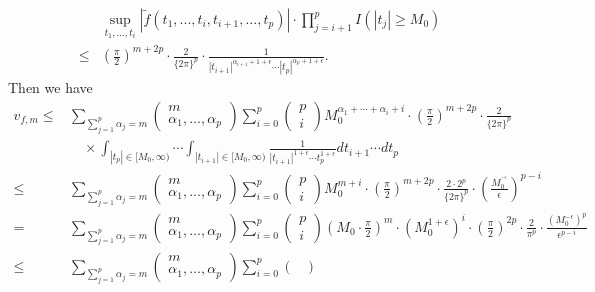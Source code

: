 \documentclass[11pt]{article}
\numberwithin{equation}{section}
\begin{document}
\begin{align*}
	&\sup_{t_1,...,t_i}|\widetilde{f}(t_1,...,t_i,t_{i+1},...,t_p)|\cdot \prod_{j=i+1}^pI(|t_j|\geq M_0)  \\
	\leq& \left(\frac{\pi}{2}\right)^{m+2p}\cdot\frac{2}{\{2\pi\}^{p}}\cdot   \frac{1}{|t_{i+1}|^{\alpha_{i+1}+1+\epsilon}\cdots |t_p|^{\alpha_{p}+1+\epsilon}}.
\end{align*}
Then we have
\begin{align*}
	v_{f,m}	
	\leq & \sum_{\sum_{j=1}^p\alpha_j=m}\begin{pmatrix}
		m\\
		\alpha_1,...,\alpha_p
	\end{pmatrix}  \sum_{i=0}^p \begin{pmatrix}
		p\\
		i
	\end{pmatrix} M_0^{\alpha_1+\cdots+\alpha_i+i}\cdot \left(\frac{\pi}{2}\right)^{m+2p}\cdot\frac{2}{\{2\pi\}^{p}} \\
	&\quad \times   \int_{|t_p|\in [M_0,\infty)}\cdots\int_{|t_{i+1}|\in [M_0,\infty)}   \frac{1}{|t_{i+1}|^{1+\epsilon}\cdots t_p^{1+\epsilon}}dt_{i+1}\cdots dt_p \\
	\leq &\sum_{\sum_{j=1}^p\alpha_j=m}\begin{pmatrix}
		m\\
		\alpha_1,...,\alpha_p
	\end{pmatrix}  \sum_{i=0}^p \begin{pmatrix}
		p\\
		i
	\end{pmatrix} M_0^{m+i}\cdot \left(\frac{\pi}{2}\right)^{m+2p}\cdot\frac{2\cdot 2^p}{\{2\pi\}^{p}}\cdot \left(\frac{M_0^{^{-\epsilon}}}{\epsilon}\right)^{p-i}\\
	=&\sum_{\sum_{j=1}^p\alpha_j=m}\begin{pmatrix}
		m\\
		\alpha_1,...,\alpha_p
	\end{pmatrix}  \sum_{i=0}^p \begin{pmatrix}
		p\\
		i
	\end{pmatrix} \left(M_0\cdot \frac{\pi}{2}\right)^{m}\cdot \left(M_0^{1+\epsilon}\right)^i\cdot\left(\frac{\pi}{2}\right)^{2p}\cdot \frac{2}{\pi^{p}}\cdot \frac{\left(M_0^{-\epsilon}\right)^p}{\epsilon^{p-i}} \\
	\leq&\sum_{\sum_{j=1}^p\alpha_j=m}\begin{pmatrix}
		m\\
		\alpha_1,...,\alpha_p
	\end{pmatrix}  \sum_{i=0}^p \begin{pmatrix}

\end{pmatrix}
\end{align*}
\end{document}
